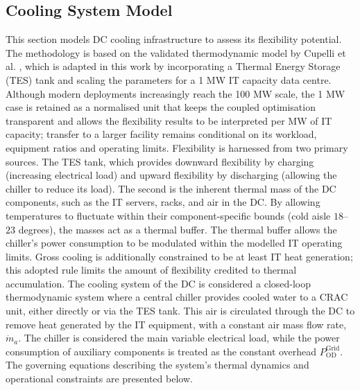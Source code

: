\documentclass[lettersize,journal]{IEEEtran}
\newcommand{\rev}[1]{#1}
\begin{document}
\subsection{Cooling System Model} \label{sec: Cooling Infrastructure Flexibility} 
This section models DC cooling infrastructure to assess its flexibility potential. The methodology is based on the validated thermodynamic model by Cupelli et al. \cite{cupelli2018data}, which is adapted in this work by incorporating a Thermal Energy Storage (TES) tank and scaling the parameters for a 1 MW IT capacity data centre. \rev{Although modern deployments increasingly reach the 100 MW scale, the 1 MW case is retained as a normalised unit that keeps the coupled optimisation transparent and allows the flexibility results to be interpreted per MW of IT capacity; transfer to a larger facility remains conditional on its workload, equipment ratios and operating limits.}
Flexibility is harnessed from two primary sources. The TES tank, which provides downward flexibility by charging (increasing electrical load) and upward flexibility by discharging (allowing the chiller to reduce its load). The second is the inherent thermal mass of the DC components, such as the IT servers, racks, and air in the DC. By allowing temperatures to fluctuate within their component-specific bounds (cold aisle $18$--$23$ degrees), the masses act as a thermal buffer. The thermal buffer allows the chiller's power consumption to be modulated within the modelled IT operating limits. Gross cooling is additionally constrained to be at least IT heat generation; this adopted rule limits the amount of flexibility credited to thermal accumulation.
The cooling system of the DC is considered a closed-loop thermodynamic system where a central chiller provides cooled water to a CRAC unit, either directly or via the TES tank. This air is circulated through the DC to remove heat generated by the IT equipment, with a constant air mass flow rate, $\dot{m}_{a}$. The chiller is considered the main variable electrical load, while the power consumption of auxiliary components is treated as \rev{the constant overhead $P^{\mathrm{Grid}}_{\mathrm{OD}}$}. The governing equations describing the system's thermal dynamics and operational constraints are presented below.
\end{document}
